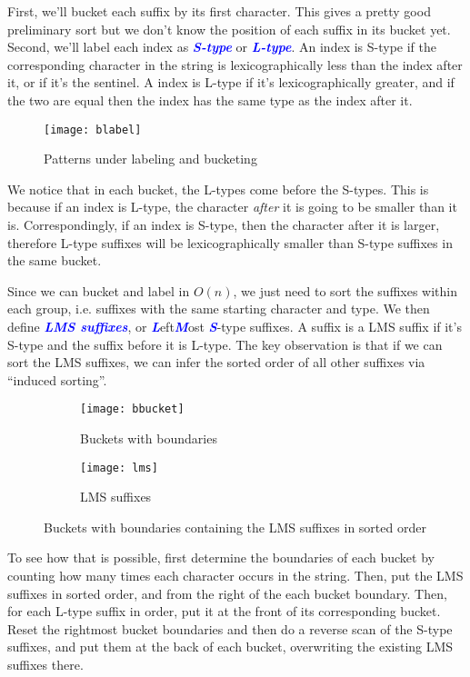 \documentclass[11pt, oneside]{article}
\newcommand{\emphasis}[1]{\textcolor{blue}{\textbf{\textit{#1}}}}
\begin{document}
First, we'll bucket each suffix by its first character.
This gives a pretty good preliminary sort but we don't know the position of each
suffix in its bucket yet. Second, we'll label each index as \emphasis{S-type} or \emphasis{L-type}.
An index is S-type if the corresponding character in the string is lexicographically less than the index after it, or if it's the sentinel. A index is L-type if it's lexicographically greater, and if the two are equal then the index has the same
type as the index after it.

\begin{figure}[h!]
\centering
\texttt{[image: blabel]}
\caption{Patterns under labeling and bucketing}
\end{figure}

We notice that in each bucket, the L-types come before the S-types.
This is because if an index is L-type, the character \textit{after} it is going to be smaller than it is.
Correspondingly, if an index is S-type, then the character after it is larger,
therefore L-type suffixes will be lexicographically smaller than S-type suffixes in the same bucket.

Since we can bucket and label in \( O(n) \), we just need to sort the suffixes
within each group, i.e. suffixes with the same starting character and type.
We then define \emphasis{LMS suffixes}, or \emphasis{L}eft\emphasis{M}ost \emphasis{S}-type suffixes.
A suffix is a LMS suffix if it's S-type and the suffix before it is L-type.
The key observation is that if we can sort the LMS suffixes, we can
infer the sorted order of all other suffixes via ``induced sorting''.

\newpage

\begin{figure}[h!]
    \centering
    \begin{subfigure}[h]{\textwidth}
      \centering
      \texttt{[image: bbucket]}
      \caption{Buckets with boundaries}
    \end{subfigure}
    \newline
    \begin{subfigure}[h]{\textwidth}
      \centering
      \texttt{[image: lms]}
      \caption{LMS suffixes}
    \end{subfigure}
    \caption{Buckets with boundaries containing the LMS suffixes in sorted order}
\end{figure}

To see how that is possible, first determine the boundaries of each bucket by counting
how many times each character occurs in the string.
Then, put the LMS suffixes in sorted order, and from the right of the each bucket boundary.
Then, for each L-type suffix in order, put it at the front of its corresponding bucket.
Reset the rightmost bucket boundaries and then do a reverse scan of the S-type suffixes,
and put them at the back of each bucket, overwriting the existing LMS suffixes there.
\end{document}
